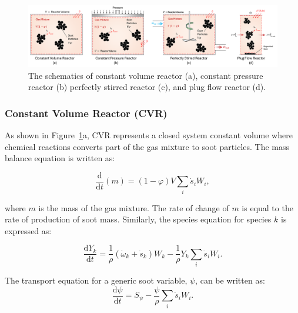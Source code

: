 \begin{figure}[H]
	\centering
	\includegraphics[width=1\textwidth]{Figures/Theory/reactors.pdf}
	\caption{The schematics of constant volume reactor (a), constant pressure reactor (b) perfectly stirred reactor (c), and plug flow reactor (d).}
	\label{fig:reactors} 
\end{figure}


\subsubsection{Constant Volume Reactor (CVR)}
\label{sec:cvr}
As shown in Figure~\ref{fig:reactors}a, CVR represents a closed system constant volume where chemical reactions converts part of the gas mixture to soot particles. The mass balance equation is written as:

\begin{equation}
	\frac{\mathrm{d}}{\mathrm{d}t}(m) = (1-\varphi)V \sum_i \dot s_i W_i,
	\label{eqn:contconstuv}
\end{equation} 

\noindent where $m$ is the mass of the gas mixture. The rate of change of $m$ is equal to the rate of production of soot mass.
Similarly, the species equation for species $k$ is expressed as:

\begin{equation}
	\frac{\mathrm{d}Y_k}{\mathrm{d}t}
	=
	\frac{1}{\rho}
	\left(
		{\dot{\omega}}_k
		+
		{\dot{s}}_k
	\right)W_k
	-\frac{1}{\rho}Y_k\sum_{i}{{\dot{s}}_i W_i}
	\label{eqn:speciesconstuv}.
\end{equation}

The transport equation for a generic soot variable, $\psi$, can be written as:
\begin{equation}
	\frac{\mathrm{d} \psi}{\mathrm{d} t}= S_{\psi} - \frac{\psi}{\rho} \sum_i \dot{s}_i W_i
	\label{eqn:sootconstuv}.
\end{equation}

